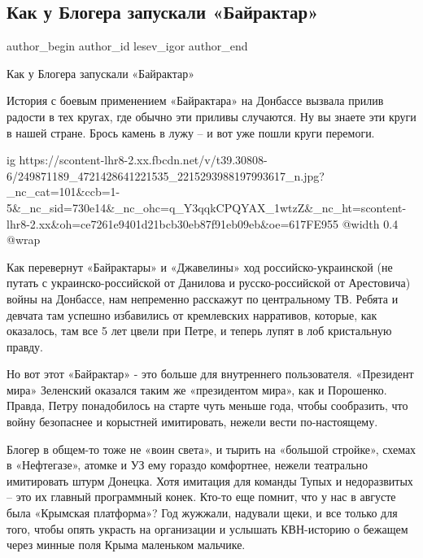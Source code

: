  
 
 
 
 
 
\subsection{Как у Блогера запускали «Байрактар»}
\label{sec:27_10_2021.fb.lesev_igor.1.bajraktar}
 
\ifcmt
 author_begin
   author_id lesev_igor
 author_end
\fi

Как у Блогера запускали «Байрактар»

История с боевым применением «Байрактара» на Донбассе вызвала прилив радости в
тех кругах, где обычно эти приливы случаются. Ну вы знаете эти круги в нашей
стране. Брось камень в лужу – и вот уже пошли круги перемоги.

\ifcmt
  ig https://scontent-lhr8-2.xx.fbcdn.net/v/t39.30808-6/249871189_4721428641221535_2215293988197993617_n.jpg?_nc_cat=101&ccb=1-5&_nc_sid=730e14&_nc_ohc=q_Y3qqkCPQYAX_1wtzZ&_nc_ht=scontent-lhr8-2.xx&oh=ce7261e9401d21bcb30eb87f91eb09eb&oe=617FE955
  @width 0.4
  @wrap 
\fi

Как перевернут «Байрактары» и «Джавелины» ход российско-украинской (не путать с
украинско-российской от Данилова и русско-российской от Арестовича) войны на
Донбассе, нам непременно расскажут по центральному ТВ. Ребята и девчата там
успешно избавились от кремлевских нарративов, которые, как оказалось, там все 5
лет цвели при Петре, и теперь лупят в лоб кристальную правду.

Но вот этот «Байрактар» - это больше для внутреннего пользователя. «Президент
мира» Зеленский оказался таким же «президентом мира», как и Порошенко. Правда,
Петру понадобилось на старте чуть меньше года, чтобы сообразить, что войну
безопаснее и корыстней имитировать, нежели вести по-настоящему.

Блогер в общем-то тоже не «воин света», и тырить на «большой стройке», схемах в
«Нефтегазе», атомке и УЗ ему гораздо комфортнее, нежели театрально имитировать
штурм Донецка. Хотя имитация для команды Тупых и недоразвитых – это их главный
программный конек. Кто-то еще помнит, что у нас в августе была «Крымская
платформа»? Год жужжали, надували щеки, и все только для того, чтобы опять
украсть на организации и услышать КВН-историю о бежащем через минные поля Крыма
маленьком мальчике.

